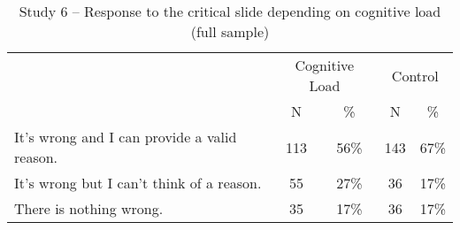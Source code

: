 \documentclass[
  american,
  man,floatsintext]{apa7}
\begin{document}
\begin{table}[tbp]

\begin{center}
\begin{threeparttable}

\caption{\label{tab:tabS6tab1dumb1all}Study 6 – Response to the critical slide depending on cognitive load (full sample)}

\begin{tabular}{lcccc}
\toprule
 & \multicolumn{2}{c}{Cognitive Load} & \multicolumn{2}{c}{Control} \\
\cmidrule(r){2-3} \cmidrule(r){4-5}
 & \multicolumn{1}{c}{N} & \multicolumn{1}{c}{\%} & \multicolumn{1}{c}{N} & \multicolumn{1}{c}{\%}\\
\midrule
It's wrong and I can provide a valid reason. & 113 & 56\% & 143 & 67\%\\
It's wrong but I can't think of a reason. & 55 & 27\% & 36 & 17\%\\
There is nothing wrong. & 35 & 17\% & 36 & 17\%\\
\bottomrule
\end{tabular}

\end{threeparttable}
\end{center}

\end{table}
\end{document}
